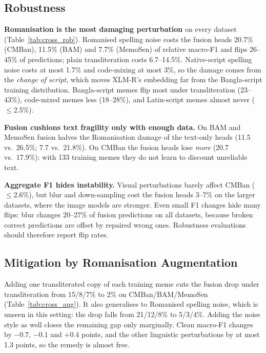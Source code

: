 \subsection{Robustness}
\label{sec:results:rob}

\textbf{Romanisation is the most damaging perturbation} on every dataset (Table~\ref{tab:cross_rob}). Romanised
spelling noise costs the fusion heads 20.7\% (CMBan), 11.5\% (BAM) and 7.7\% (MemoSen) of relative macro-F1 and
flips 26--45\% of predictions; plain transliteration costs 6.7--14.5\%. Native-script spelling noise costs at most
1.7\% and code-mixing at most 3\%, so the damage comes from the \emph{change of script}, which moves XLM-R's embedding
far from the Bangla-script training distribution. Bangla-script memes flip most under transliteration (23--43\%),
code-mixed memes less (18--28\%), and Latin-script memes almost never ($\leq$2.5\%).

\textbf{Fusion cushions text fragility only with enough data.} On BAM and MemoSen fusion halves the Romanisation
damage of the text-only heads (11.5 vs.\ 26.5\%; 7.7 vs.\ 21.8\%). On CMBan the fusion heads lose \emph{more}
(20.7 vs.\ 17.9\%): with 133 training memes they do not learn to discount unreliable text.

\textbf{Aggregate F1 hides instability.} Visual perturbations barely affect CMBan ($\leq$2.6\%), but blur and
down-sampling cost the fusion heads 3--7\% on the larger datasets, where the image models are stronger. Even small F1
changes hide many flips: blur changes 20--27\% of fusion predictions on all datasets, because broken correct
predictions are offset by repaired wrong ones. Robustness evaluations should therefore report flip rates.



\subsection{Mitigation by Romanisation Augmentation}
\label{sec:results:aug}

Adding one transliterated copy of each training meme cuts the fusion drop under transliteration from 15/8/7\% to 2\%
on CMBan/BAM/MemoSen (Table~\ref{tab:cross_aug}). It also generalises to Romanised spelling noise, which is unseen in
this setting: the drop falls from 21/12/8\% to 5/3/4\%. Adding the noise style as well closes the remaining gap only
marginally. Clean macro-F1 changes by $-0.7$, $-0.1$ and $+0.4$ points, and the other linguistic perturbations by at
most 1.3 points, so the remedy is almost free.

